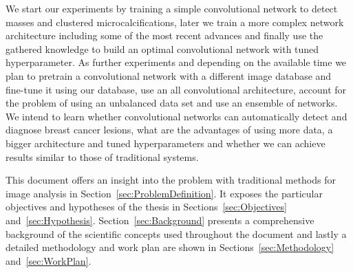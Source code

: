 We start our experiments by training a simple convolutional network to detect masses and clustered microcalcifications, later we train a more complex network architecture including some of the most recent advances and finally use the gathered knowledge to build an optimal convolutional network with tuned hyperparameter. As further experiments and depending on the available time we plan to pretrain a convolutional network with a different image database and fine-tune it using our database, use an all convolutional architecture, account for the problem of using an unbalanced data set and use an ensemble of networks. We intend to learn whether convolutional networks can automatically detect and diagnose breast cancer lesions, what are the advantages of using more data, a bigger architecture and tuned hyperparameters and whether we can achieve results similar to those of traditional systems.

This document offers an insight into the problem with traditional methods for image analysis in Section~\ref{sec:ProblemDefinition}. It exposes the particular objectives and hypotheses of the thesis in Sections~\ref{sec:Objectives} and~\ref{sec:Hypothesis}. Section~\ref{sec:Background} presents a comprehensive background of the scientific concepts used throughout the document and lastly a detailed methodology and work plan are shown in Sections~\ref{sec:Methodology} and~\ref{sec:WorkPlan}.

